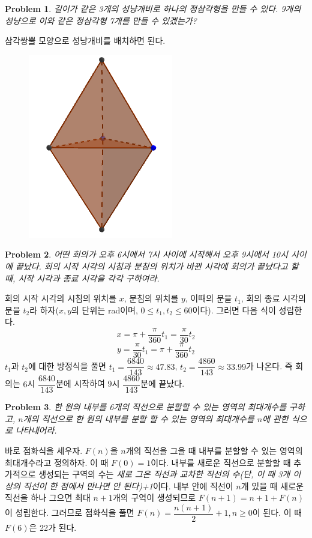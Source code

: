\documentclass[a4paper,10pt]{article}
\newtheorem{prob}{Problem}
\begin{document}
\begin{prob}
	길이가 같은 3개의 성냥개비로 하나의 정삼각형을 만들 수 있다. 9개의 성냥으로 이와 같은 정삼각형 7개를 만들 수 있겠는가?
\end{prob}
삼각쌍뿔 모양으로 성냥개비를 배치하면 된다.
\begin{figure}[h]
	\begin{center}
		\includegraphics[scale=0.5]{double_tetrahedron.png}
	\end{center}
\end{figure}
\begin{prob}
	어떤 회의가 오후 6시에서 7시 사이에 시작해서 오후 9시에서 10시 사이에 끝났다. 회의 시작 시각의 시침과 분침의 위치가 바뀐 시각에 회의가 끝났다고 할 때, 시작 시각과 종료 시각을 각각 구하여라.
\end{prob}
회의 시작 시각의 시침의 위치를 $ x $, 분침의 위치를 $ y $, 이때의 분을 $ t_1 $, 회의 종료 시각의 분을 $ t_2 $라 하자($ x,y $의 단위는 rad이며, $0 \leq t_1, t_2 \leq 60$이다). 그러면 다음 식이 성립한다.
$$x=\pi+\dfrac{\pi}{360}t_1=\dfrac{\pi}{30}t_2$$
$$y=\dfrac{\pi}{30}t_1=\pi+\dfrac{\pi}{360}t_2$$
$ t_1 $과 $ t_2 $에 대한 방정식을 풀면 $ t_1=\dfrac{6840}{143}\approx47.83$, $ t_2=\dfrac{4860}{143}\approx33.99$가 나온다. 즉 회의는 $6$시 $\dfrac{6840}{143}$분에 시작하여 9시 $ \dfrac{4860}{143} $분에 끝났다. \begin{prob}
	한 원의 내부를 6개의 직선으로 분할할 수 있는 영역의 최대개수를 구하고, $n$개의 직선으로 한 원의 내부를 분할 할 수 있는 영역의 최대개수를 $n$에 관한 식으로 나타내어라.
\end{prob}
바로 점화식을 세우자. $ F(n) $을 $n$개의 직선을 그을 때 내부를 분할할 수 있는 영역의 최대개수라고 정의하자. 이 때 $F(0)=1$이다. 내부를 새로운 직선으로 분할할 때 추가적으로 생성되는 구역의 수는 \emph{새로 그은 직선과 교차한 직선의 수(단, 이 때 3개 이상의 직선이 한 점에서 만나면 안 된다)+1}이다. 내부 안에 직선이 $n$개 있을 때 새로운 직선을 하나 그으면 최대 $ n+1 $개의 구역이 생성되므로 $F(n+1)=n+1+F(n)$이 성립한다. 그러므로 점화식을 풀면 $ F(n)=\dfrac{n(n+1)}{2}+1, n\geq0 $이 된다. 이 때 $F(6)$은 22가 된다.\\
\\
\end{document}
